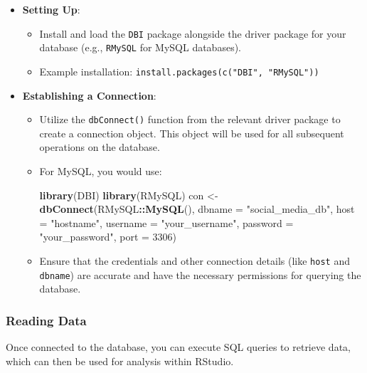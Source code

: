 \documentclass[
]{book}
\newenvironment{Shaded}{\begin{snugshade}}{\end{snugshade}}
\newcommand{\AttributeTok}[1]{\textcolor[rgb]{0.13,0.29,0.53}{#1}}
\newcommand{\DecValTok}[1]{\textcolor[rgb]{0.00,0.00,0.81}{#1}}
\newcommand{\FunctionTok}[1]{\textcolor[rgb]{0.13,0.29,0.53}{\textbf{#1}}}
\newcommand{\NormalTok}[1]{#1}
\newcommand{\OtherTok}[1]{\textcolor[rgb]{0.56,0.35,0.01}{#1}}
\newcommand{\SpecialCharTok}[1]{\textcolor[rgb]{0.81,0.36,0.00}{\textbf{#1}}}
\newcommand{\StringTok}[1]{\textcolor[rgb]{0.31,0.60,0.02}{#1}}
\providecommand{\tightlist}{%
  \setlength{\itemsep}{0pt}\setlength{\parskip}{0pt}}
\begin{document}
\begin{itemize}
\tightlist
\item
  \textbf{Setting Up}:

  \begin{itemize}
  \tightlist
  \item
    Install and load the \texttt{DBI} package alongside the driver package for your database (e.g., \texttt{RMySQL} for MySQL databases).
  \item
    Example installation: \texttt{install.packages(c("DBI",\ "RMySQL"))}
  \end{itemize}
\item
  \textbf{Establishing a Connection}:

  \begin{itemize}
  \item
    Utilize the \texttt{dbConnect()} function from the relevant driver package to create a connection object. This object will be used for all subsequent operations on the database.
  \item
    For MySQL, you would use:

\begin{Shaded}
\begin{Highlighting}[]
\FunctionTok{library}\NormalTok{(DBI)}
\FunctionTok{library}\NormalTok{(RMySQL)}
\NormalTok{con }\OtherTok{\textless{}{-}} \FunctionTok{dbConnect}\NormalTok{(RMySQL}\SpecialCharTok{::}\FunctionTok{MySQL}\NormalTok{(), }\AttributeTok{dbname =} \StringTok{"social\_media\_db"}\NormalTok{, }\AttributeTok{host =} \StringTok{"hostname"}\NormalTok{, }\AttributeTok{username =} \StringTok{"your\_username"}\NormalTok{, }\AttributeTok{password =} \StringTok{"your\_password"}\NormalTok{, }\AttributeTok{port =} \DecValTok{3306}\NormalTok{)}
\end{Highlighting}
\end{Shaded}
  \item
    Ensure that the credentials and other connection details (like \texttt{host} and \texttt{dbname}) are accurate and have the necessary permissions for querying the database.
  \end{itemize}
\end{itemize}

\hypertarget{reading-data}{%
\subsubsection{Reading Data}\label{reading-data}}

Once connected to the database, you can execute SQL queries to retrieve data, which can then be used for analysis within RStudio.
\end{document}
